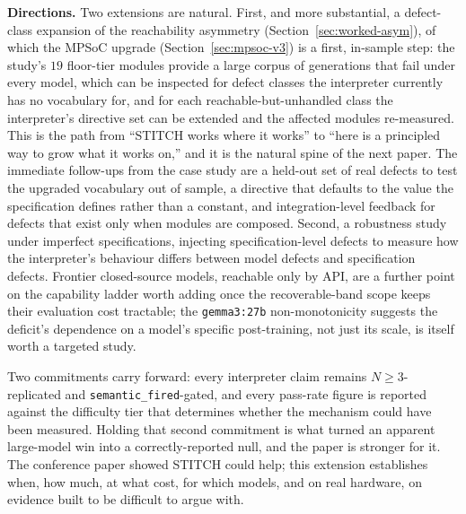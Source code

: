 \documentclass[11pt]{article}
\begin{document}
\textbf{Directions.} Two extensions are natural. First, and more substantial,
a defect-class expansion of the reachability asymmetry
(Section~\ref{sec:worked-asym}), of which the MPSoC upgrade
(Section~\ref{sec:mpsoc-v3}) is a first, in-sample step: the study's $19$
floor-tier modules provide a large corpus of generations that fail under every
model, which can be inspected for defect classes the interpreter currently has
no vocabulary for, and for each reachable-but-unhandled class the interpreter's
directive set can be extended and the affected modules re-measured. This is the
path from ``STITCH works where it works'' to ``here is a principled way to grow
what it works on,'' and it is the natural spine of the next paper. The
immediate follow-ups from the case study are a held-out set of real defects to
test the upgraded vocabulary out of sample, a directive that defaults to the
value the specification defines rather than a constant, and
integration-level feedback for defects that exist only when modules are
composed. Second, a robustness study under imperfect specifications, injecting
specification-level defects to measure how the interpreter's behaviour differs
between model defects and specification defects. Frontier closed-source models,
reachable only by API, are a further point on the capability ladder worth
adding once the recoverable-band scope keeps their evaluation cost tractable;
the \texttt{gemma3:27b} non-monotonicity suggests the deficit's dependence on a
model's specific post-training, not just its scale, is itself worth a targeted
study.

Two commitments carry forward: every interpreter claim remains
$N{\geq}3$-replicated and \texttt{semantic\_fired}-gated, and every pass-rate
figure is reported against the difficulty tier that determines whether the
mechanism could have been measured. Holding that second commitment is what
turned an apparent large-model win into a correctly-reported null, and the
paper is stronger for it. The conference paper showed STITCH could help; this
extension establishes when, how much, at what cost, for which models, and on
real hardware, on evidence built to be difficult to argue with.
\end{document}
